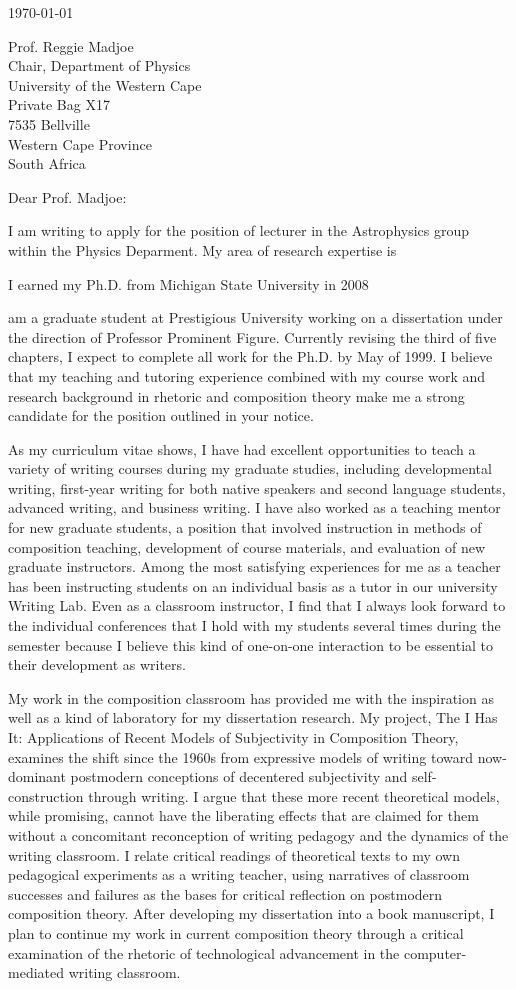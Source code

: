 \documentclass[11pt]{article}
\begin{document}
\today

Prof. Reggie Madjoe\\
Chair, Department of Physics\\
University of the Western Cape\\
Private Bag X17\\
7535 Bellville\\
Western Cape Province\\
South Africa

Dear Prof. Madjoe:

I am writing to apply for the position of lecturer in the Astrophysics
group within the Physics Deparment. My area of research expertise is 

I earned my Ph.D. from Michigan
State University in 2008

am a graduate
student at Prestigious University working on a dissertation under the
direction of Professor Prominent Figure. Currently revising the third
of five chapters, I expect to complete all work for the Ph.D. by May
of 1999. I believe that my teaching and tutoring experience combined
with my course work and research background in rhetoric and
composition theory make me a strong candidate for the position
outlined in your notice.

As my curriculum vitae shows, I have had excellent opportunities to
teach a variety of writing courses during my graduate studies,
including developmental writing, first-year writing for both native
speakers and second language students, advanced writing, and business
writing. I have also worked as a teaching mentor for new graduate
students, a position that involved instruction in methods of
composition teaching, development of course materials, and evaluation
of new graduate instructors. Among the most satisfying experiences for
me as a teacher has been instructing students on an individual basis
as a tutor in our university Writing Lab. Even as a classroom
instructor, I find that I always look forward to the individual
conferences that I hold with my students several times during the
semester because I believe this kind of one-on-one interaction to be
essential to their development as writers.

My work in the composition classroom has provided me with the
inspiration as well as a kind of laboratory for my dissertation
research. My project, The I Has It: Applications of Recent Models of
Subjectivity in Composition Theory, examines the shift since the 1960s
from expressive models of writing toward now-dominant postmodern
conceptions of decentered subjectivity and self-construction through
writing.  I argue that these more recent theoretical models, while
promising, cannot have the liberating effects that are claimed for
them without a concomitant reconception of writing pedagogy and the
dynamics of the writing classroom. I relate critical readings of
theoretical texts to my own pedagogical experiments as a writing
teacher, using narratives of classroom successes and failures as the
bases for critical reflection on postmodern composition theory. After
developing my dissertation into a book manuscript, I plan to continue
my work in current composition theory through a critical examination
of the rhetoric of technological advancement in the computer-mediated
writing classroom.
\end{document}
